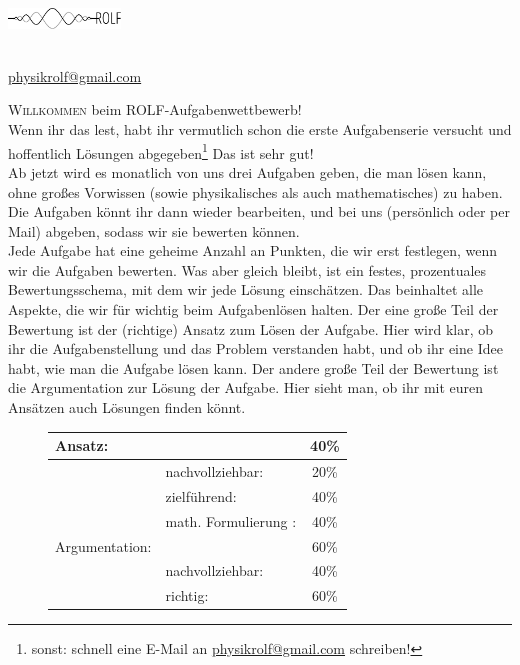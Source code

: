 \documentclass[a4paper]{article}
\begin{document}
	\vspace*{-2cm}
	\parbox{4cm}{\includegraphics[width=3cm]{../images/logo_scaled.pdf}}
	\parbox{10.6cm}{ \\  \href{mailto:physikrolf@gmail.com}{physikrolf@gmail.com} \\ \vspace*{-.5cm} }
\thispagestyle{empty}	
\vspace{1cm}
\noindent
\newline
\textsc{Willkommen} beim ROLF-Aufgabenwettbewerb!\\
Wenn ihr das lest, habt ihr vermutlich schon die erste Aufgabenserie versucht und hoffentlich Lösungen abgegeben\footnote{sonst: schnell eine E-Mail an  \href{mailto:physikrolf@gmail.com}{physikrolf@gmail.com} schreiben!} Das ist sehr gut!\\
Ab jetzt wird es monatlich von uns drei Aufgaben geben, die man lösen kann, ohne großes Vorwissen (sowie physikalisches als auch mathematisches) zu haben.  Die Aufgaben könnt ihr dann wieder bearbeiten, und bei uns (persönlich oder per Mail) abgeben, sodass wir sie bewerten können.\\
Jede Aufgabe hat eine geheime Anzahl an Punkten, die wir erst festlegen, wenn wir die Aufgaben bewerten. Was aber gleich bleibt, ist ein festes, prozentuales Bewertungsschema, mit dem wir jede Lösung einschätzen. Das beinhaltet alle Aspekte, die wir für wichtig beim Aufgabenlösen halten. Der eine große Teil der Bewertung ist der (richtige) Ansatz zum Lösen der Aufgabe. Hier wird klar, ob ihr die Aufgabenstellung und das Problem verstanden habt, und ob ihr eine Idee habt, wie man die Aufgabe lösen kann. Der andere große Teil der Bewertung ist die Argumentation zur Lösung der Aufgabe. Hier sieht man, ob ihr mit euren Ansätzen auch Lösungen finden könnt. 
\newline
\begin{figure}[h]
	\centering
\begin{tabular}{l| l c}
	Ansatz: & & 40\%\\\hline
	& nachvollziehbar:&20\%\\
	&zielführend:&40\%\\
	&math. Formulierung :& 40\%\\\hline\hline
	Argumentation:& &60\% \\\hline
	&nachvollziehbar:&40\%\\
	&richtig:&60\%\\\hline
	
\end{tabular}
\end{figure}
\end{document}
